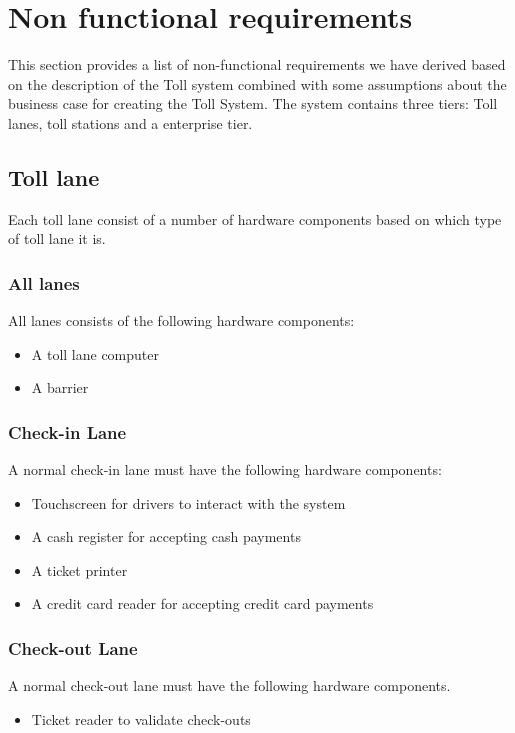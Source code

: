 \section{Non functional requirements}
\label{sec:non-func}
\madeby{\jb}{\mb}
This section provides a list of non-functional requirements we have derived based on the description of the Toll system combined with some assumptions about the business case for creating the Toll System.
The system contains three tiers: Toll lanes, toll stations and a enterprise tier. 

\subsection{Toll lane}
Each toll lane consist of a number of hardware components based on which type of toll lane it is.

\subsubsection*{All lanes}
All lanes consists of the following hardware components:

\begin{itemize}
\item A toll lane computer
\item A barrier
\end{itemize}

\subsubsection*{Check-in Lane}
A normal check-in lane must have the following hardware components:

\begin{itemize}
\item Touchscreen for drivers to interact with the system
\item A cash register for accepting cash payments
\item A ticket printer
\item A credit card reader for accepting credit card payments
\end{itemize}

\subsubsection*{Check-out Lane}
A normal check-out lane must have the following hardware components.

\begin{itemize}
\item Ticket reader to validate check-outs
\end{itemize}

